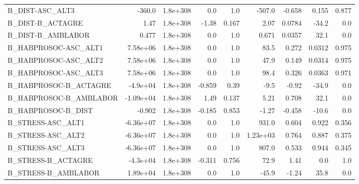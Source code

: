 \begin{tabular}{lrrrrrrrr}
B\_DIST-ASC\_ALT3                   &      -360.0 &     1.8e+308 &      0.0 &      1.0 &     -507.0 &      -0.658 &        0.155 &         0.877 \\
B\_DIST-B\_ACTAGRE                  &        1.47 &     1.8e+308 &    -1.38 &    0.167 &       2.07 &      0.0784 &        -34.2 &           0.0 \\
B\_DIST-B\_AMBLABOR                 &       0.477 &     1.8e+308 &      0.0 &      1.0 &      0.671 &      0.0357 &         32.1 &           0.0 \\
B\_HABPROSOC-ASC\_ALT1              &    7.58e+06 &     1.8e+308 &      0.0 &      1.0 &       83.5 &       0.272 &       0.0312 &         0.975 \\
B\_HABPROSOC-ASC\_ALT2              &    7.58e+06 &     1.8e+308 &      0.0 &      1.0 &       47.9 &       0.149 &       0.0314 &         0.975 \\
B\_HABPROSOC-ASC\_ALT3              &    7.58e+06 &     1.8e+308 &      0.0 &      1.0 &       98.4 &       0.326 &       0.0363 &         0.971 \\
B\_HABPROSOC-B\_ACTAGRE             &    -4.9e+04 &     1.8e+308 &   -0.859 &     0.39 &       -9.5 &       -0.92 &        -34.9 &           0.0 \\
B\_HABPROSOC-B\_AMBLABOR            &   -1.09e+04 &     1.8e+308 &     1.49 &    0.137 &       5.21 &       0.708 &         32.1 &           0.0 \\
B\_HABPROSOC-B\_DIST                &      -0.902 &     1.8e+308 &   -0.185 &    0.853 &      -1.27 &      -0.458 &        -10.6 &           0.0 \\
B\_STRESS-ASC\_ALT1                 &   -6.36e+07 &     1.8e+308 &      0.0 &      1.0 &      931.0 &       0.604 &        0.922 &         0.356 \\
B\_STRESS-ASC\_ALT2                 &   -6.36e+07 &     1.8e+308 &      0.0 &      1.0 &   1.23e+03 &       0.764 &        0.887 &         0.375 \\
B\_STRESS-ASC\_ALT3                 &   -6.36e+07 &     1.8e+308 &      0.0 &      1.0 &      807.0 &       0.533 &        0.944 &         0.345 \\
B\_STRESS-B\_ACTAGRE                &    -4.3e+04 &     1.8e+308 &   -0.311 &    0.756 &       72.9 &        1.41 &          0.0 &           1.0 \\
B\_STRESS-B\_AMBLABOR               &    1.89e+04 &     1.8e+308 &      0.0 &      1.0 &      -45.9 &       -1.24 &         35.8 &           0.0 \\

\end{tabular}
